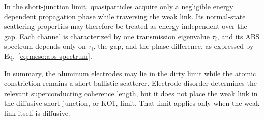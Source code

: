         In the short-junction limit, quasiparticles acquire only a negligible energy dependent propagation phase while traversing the weak link. Its normal-state scattering properties may therefore be treated as energy independent over the gap. Each channel is characterized by one transmission eigenvalue $\tau_i$, and its ABS spectrum depends only on $\tau_i$, the gap, and the phase difference, as expressed by Eq.~\eqref{eq:meso:abs-spectrum}.

        In summary, the aluminum electrodes may lie in the dirty limit while the atomic constriction remains a short ballistic scatterer. Electrode disorder determines the relevant superconducting coherence length, but it does not place the weak link in the diffusive short-junction, or KO1, limit. That limit applies only when the weak link itself is diffusive.
